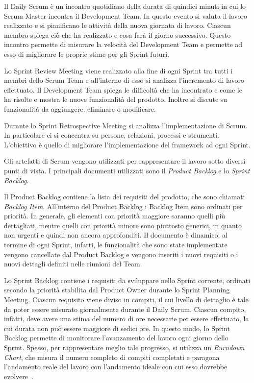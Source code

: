			Il Daily Scrum è un incontro quotidiano della durata di quindici minuti in cui lo Scrum Master incontra il Development Team. 
			In questo evento si valuta il lavoro realizzato e si pianificano le attività della nuova giornata di lavoro.
			Ciascun membro spiega ciò che ha realizzato e cosa farà il giorno successivo.
			Questo incontro permette di misurare la velocità del Development Team e permette ad esso di migliorare le proprie stime per gli Sprint futuri.
			
			Lo Sprint Review Meeting viene realizzato alla fine di ogni Sprint tra tutti i membri dello Scrum Team e all'interno di esso si analizza l'incremento di lavoro effettuato.
			Il Development Team spiega le difficoltà che ha incontrato e come le ha risolte e mostra le nuove funzionalità del prodotto.
			Inoltre si discute su funzionalità da aggiungere, eliminare o modificare.

			Durante lo Sprint Retrospective Meeting si analizza l'implementazione di Scrum. 
			In particolare ci si concentra su persone, relazioni, processi e strumenti.
			L'obiettivo è quello di migliorare l'implementazione del framework ad ogni Sprint.

			Gli artefatti di Scrum vengono utilizzati per rappresentare il lavoro sotto diversi punti di vista.
			I principali documenti utilizzati sono il \emph{Product Backlog} e lo \emph{Sprint Backlog}.
			
			Il Product Backlog contiene la lista dei requisiti del prodotto, che sono chiamati \emph{Backlog Item}.
			All'interno del Product Backlog i Backlog Item sono ordinati per priorità.
			In generale, gli elementi con priorità maggiore saranno quelli più dettagliati, mentre quelli con priorità minore sono  piuttosto generici, in quanto non urgenti e quindi non ancora approfonditi.
			Il documento è dinamico: al termine di ogni Sprint, infatti, le funzionalità che sono state implementate vengono cancellate dal Product Backlog e vengono inseriti i nuovi requisiti o i nuovi dettagli definiti nelle riunioni del Team.

			Lo Sprint Backlog contiene i requisiti da sviluppare nello Sprint corrente, ordinati secondo la priorità stabilita dal Product Owner durante lo Sprint Planning Meeting.
			Ciascun requisito viene diviso in compiti, il cui livello di dettaglio è tale da poter essere misurato giornalmente durante il Daily Scrum.
			Ciascun compito, infatti, deve avere una stima del numero di ore necessarie per essere effettuato, la cui durata non può essere maggiore di sedici ore.
			In questo modo, lo Sprint Backlog permette di monitorare l'avanzamento del lavoro ogni giorno dello Sprint.
			Spesso, per rappresentare meglio tale progresso, si utilizza un \emph{Burndown Chart}, che misura il numero completo di compiti completati e paragona l'andamento reale del lavoro con l'andamento ideale con cui esso dovrebbe evolvere~\cite{scrumEnglishGuide}.

